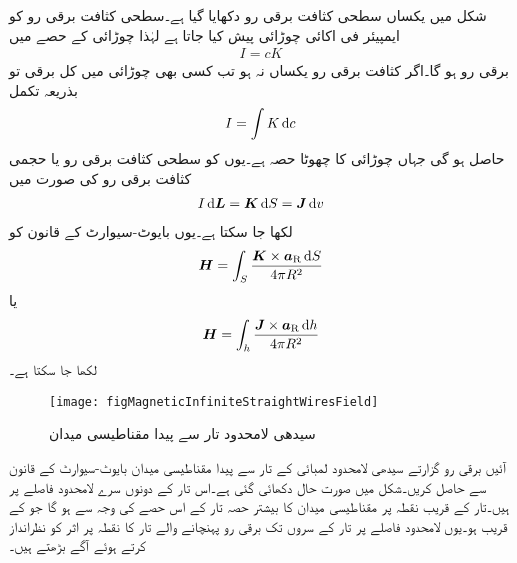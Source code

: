شکل  میں یکساں سطحی کثافت برقی رو  دکھایا گیا ہے۔سطحی کثافت برقی رو کو ایمپیئر فی اکائی چوڑائی پیش کیا جاتا ہے لہٰذا  چوڑائی کے حصے میں
\begin{align*}
I=cK
\end{align*}
 برقی رو ہو گا۔اگر کثافت برقی رو یکساں نہ ہو تب کسی بھی چوڑائی میں کل برقی تو بذریعہ تکمل
\begin{align*}
I=\int K \dif c
\end{align*}
حاصل ہو گی جہاں  چوڑائی کا چھوٹا حصہ ہے۔یوں  کو سطحی کثافت برقی رو  یا حجمی کثافت برقی رو  کی صورت میں
\begin{align}\label{مساوات-مقناطیسی_تفرقی_برقی_رو_مختلف_صورت}
I \dif \kvec{L}=\kvec{K} \dif S=\kvec{J} \dif v
\end{align}
لکھا جا سکتا ہے۔یوں بایوٹ-سیوارٹ کے قانون کو
\begin{align}
\kvec{H}=\int_S \frac{\kvec{K} \times \aR \dif S}{4\pi R^2}
\end{align}
یا
\begin{align}
\kvec{H}=\int_h \frac{\kvec{J} \times \aR \dif h}{4\pi R^2}
\end{align}
لکھا جا سکتا ہے۔

\begin{figure}
\centering
\texttt{[image: figMagneticInfiniteStraightWiresField]}
\caption{سیدھی لامحدود تار سے پیدا مقناطیسی میدان}
\label{شکل_مقناطیسی_سیدھی_لامحدود_تار_کا_میدان}
\end{figure}
آئیں برقی رو گزارتے سیدھی  لامحدود لمبائی کے تار سے پیدا مقناطیسی میدان بایوٹ-سیوارٹ کے قانون سے حاصل کریں۔شکل  میں صورت حال دکھائی گئی ہے۔اس تار کے دونوں سرے لامحدود فاصلے پر ہیں۔تار کے قریب نقطہ  پر مقناطیسی میدان کا بیشتر حصہ تار کے اس حصے کی وجہ سے ہو گا جو  کے قریب ہو۔یوں لامحدود فاصلے پر تار کے سروں تک برقی رو پہنچانے  والے تار کا نقطہ  پر اثر کو نظرانداز کرتے ہوئے آگے بڑھتے ہیں۔ 

